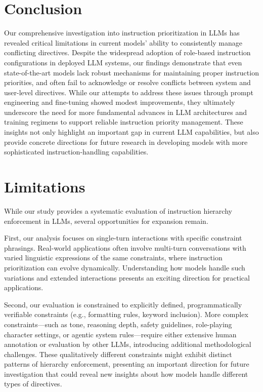 \section{Conclusion}\label{sec:conclusion}

Our comprehensive investigation into instruction prioritization in LLMs has revealed critical limitations in current models' ability to consistently manage conflicting directives. Despite the widespread adoption of role-based instruction configurations in deployed LLM systems, our findings demonstrate that even state-of-the-art models lack robust mechanisms for maintaining proper instruction priorities, and often fail to acknowledge or resolve conflicts between system and user-level directives. While our attempts to address these issues through prompt engineering and fine-tuning showed modest improvements, they ultimately underscore the need for more fundamental advances in LLM architectures and training regimens to support reliable instruction priority management. These insights not only highlight an important gap in current LLM capabilities, but also provide concrete directions for future research in developing models with more sophisticated instruction-handling capabilities.


\section*{Limitations}\label{sec:limitation}

While our study provides a systematic evaluation of instruction hierarchy enforcement in LLMs, several opportunities for expansion remain. 

First, our analysis focuses on single-turn interactions with specific constraint phrasings. Real-world applications often involve multi-turn conversations with varied linguistic expressions of the same constraints, where instruction prioritization can evolve dynamically. Understanding how models handle such variations and extended interactions presents an exciting direction for practical applications.

Second, our evaluation is constrained to explicitly defined, programmatically verifiable constraints (e.g., formatting rules, keyword inclusion). More complex constraints—such as tone, reasoning depth, safety guidelines, role-playing character settings, or agentic system rules—require either extensive human annotation or evaluation by other LLMs, introducing additional methodological challenges. These qualitatively different constraints might exhibit distinct patterns of hierarchy enforcement, presenting an important direction for future investigation that could reveal new insights about how models handle different types of directives.

